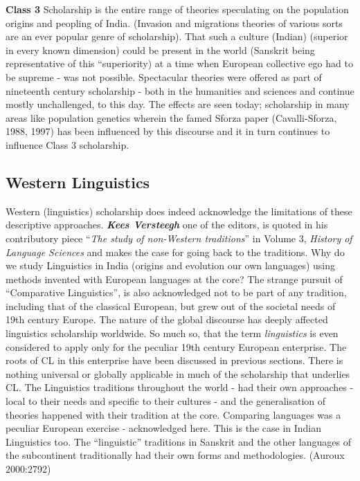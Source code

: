 \textbf{Class 3} Scholarship is the entire range of theories speculating on the population origins and peopling of India. (Invasion and migrations theories of various sorts are an ever popular genre of scholarship). That such a culture (Indian) (superior in every known dimension) could be present in the world (Sanskrit being representative of this “superiority) at a time when European collective ego had to be supreme - was not possible. Spectacular theories were offered as part of nineteenth century scholarship - both in the humanities and sciences and continue mostly unchallenged, to this day. The effects are seen today; scholarship in many areas like population genetics wherein the famed Sforza paper (Cavalli-Sforza, 1988, 1997) has been influenced by this discourse and it in turn continues to influence Class 3 scholarship.


\subsection*{Western Linguistics}

Western (linguistics) scholarship does indeed acknowledge the limitations of these descriptive approaches. \textbf{\textit{Kees Versteegh}} one of the editors, is quoted in his contributory piece “\textit{The study of non-Western traditions}” in Volume 3, \textit{History of Language Sciences} and makes the case for going back to the traditions. Why do we study Linguistics in India (origins and evolution our own languages) using methods invented with European languages at the core? The strange pursuit of “Comparative Linguistics”, is also acknowledged not to be part of any tradition, including that of the classical European, but grew out of the societal needs of 19th century Europe. The nature of the global discourse has deeply affected linguistics scholarship worldwide. So much so, that the term \textit{linguistics} is even considered to apply only for the peculiar 19th century European enterprise. The roots of CL in this enterprise have been discussed in previous sections. There is nothing universal or globally applicable in much of the scholarship that underlies CL. The Linguistics traditions throughout the world - had their own approaches - local to their needs and specific to their cultures - and the generalisation of theories happened with their tradition at the core. Comparing languages was a peculiar European exercise - acknowledged here. This is the case in Indian Linguistics too. The “linguistic” traditions in Sanskrit and the other languages of the subcontinent traditionally had their own forms and methodologies. (Auroux 2000:2792)

